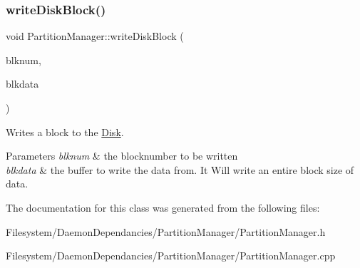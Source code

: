 \subsubsection{\texorpdfstring{write\+Disk\+Block()}{writeDiskBlock()}}
{\footnotesize\ttfamily void Partition\+Manager\+::write\+Disk\+Block (\begin{DoxyParamCaption}\item[{Blk\+Num\+Type}]{blknum,  }\item[{char $\ast$}]{blkdata }\end{DoxyParamCaption})}

Writes a block to the \mbox{\hyperlink{classDisk}{Disk}}. 
\begin{DoxyParams}{Parameters}
{\em blknum} & the blocknumber to be written \\
\hline
{\em blkdata} & the buffer to write the data from. It Will write an entire block size of data. \\
\hline
\end{DoxyParams}


The documentation for this class was generated from the following files\+:\begin{DoxyCompactItemize}
\item 
Filesystem/\+Daemon\+Dependancies/\+Partition\+Manager/Partition\+Manager.\+h\item 
Filesystem/\+Daemon\+Dependancies/\+Partition\+Manager/Partition\+Manager.\+cpp\end{DoxyCompactItemize}
